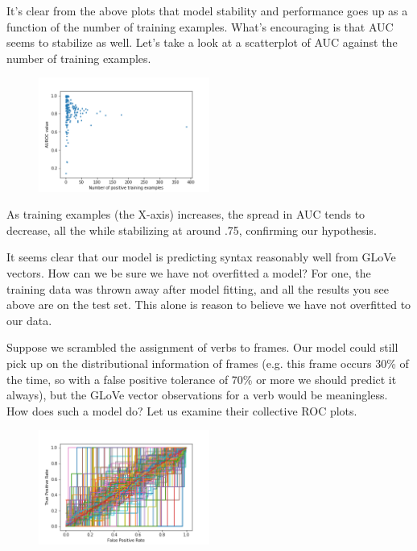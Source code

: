 \documentclass[a4paper]{article}
\begin{document}
It's clear from the above plots that model stability and performance goes up as a function of the number of training examples. What's encouraging is that AUC seems to stabilize as well. Let's take a look at a scatterplot of AUC against the number of training examples.

\begin{figure}[H]
\centering
\includegraphics[width=0.5\textwidth]{auc_scatter5.png}
\caption{\label{fig:frog} }
\end{figure}

As training examples (the X-axis) increases, the spread in AUC tends to decrease, all the while stabilizing at around .75, confirming our hypothesis.

It seems clear that our model is predicting syntax reasonably well from GLoVe vectors. How can we be sure we have not overfitted a model? For one, the training data was thrown away after model fitting, and all the results you see above are on the test set. This alone is reason to believe we have not overfitted to our data.

Suppose we scrambled the assignment of verbs to frames. Our model could still pick up on the distributional information of frames (e.g. this frame occurs 30\% of the time, so with a false positive tolerance of 70\% or more we should predict it always), but the GLoVe vector observations for a verb would be meaningless. How does such a model do? Let us examine their collective ROC plots. 

\begin{figure}[H]
	\centering
	\includegraphics[width=0.5\textwidth]{auc_plot5rand.png}
	\caption{\label{fig:frog} }
\end{figure}
\end{document}
